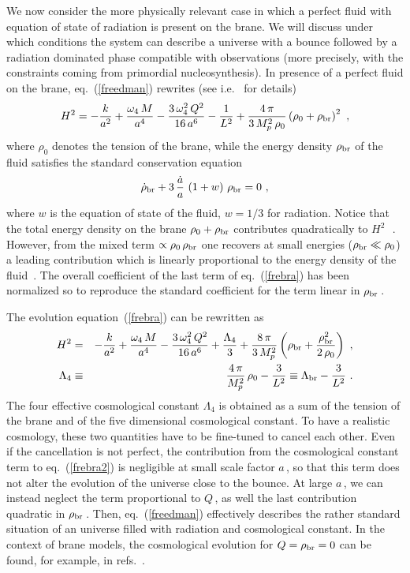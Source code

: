 \documentclass[a4paper,11pt]{article}
\begin{document}
We now consider the more physically relevant case in which a perfect fluid
with equation of state of radiation is present on the brane. We will
discuss under which conditions the system can describe a universe with a
bounce followed by a radiation dominated phase compatible with
observations (more precisely, with the constraints coming from primordial
nucleosynthesis). In presence of a perfect fluid on the brane,
eq.~(\ref{freedman}) rewrites (see i.e.~\cite{MV} for details)
%
\begin{equation}
H^2 = - \frac{k}{a^2} + \frac{\omega_4 \, M}{a^4} - \frac{3\,\omega_4^2\,Q^2}{16\,a^6} - \frac{1}{L^2} + \frac{4 \, \pi}{3 \, M_p^2 \, \rho_0} \left( \rho_0 + \rho_{\rm br} \right)^2 \,\,,
\label{frebra}
\end{equation}
%
where $\rho_0$ denotes the tension of the brane, while the energy density $\rho_{\rm br}$ of the fluid satisfies the standard conservation equation
%
\begin{equation}
\dot{\rho}_{\rm br} + 3 \, \frac{\dot{a}}{a} \, \left( 1 + w \right) \, \rho_{\rm br} = 0 \,\,,
\end{equation}
%
where $w$ is the equation of state of the fluid, $w=1/3$ for radiation. 
Notice that the total energy density on the brane $\rho_0+\rho_{\rm br}$
contributes quadratically to $H^2\,$~\cite{BDL}. However, from the mixed
term $\propto \rho_0 \, \rho_{\rm br}$ one recovers at small energies
($\rho_{\rm br} \ll \rho_0$) a leading contribution which is linearly
proportional to the energy density of the fluid~\cite{CGKT,CGS}. The
overall coefficient of the last term of eq.~(\ref{frebra}) has been
normalized so to reproduce the standard coefficient for the term linear in
$\rho_{\rm br}\,$.

The evolution equation~(\ref{frebra}) can be rewritten as
%
\begin{eqnarray}
H^2 &=& - \frac{k}{a^2} + \frac{\omega_4 \, M}{a^4} - \frac{3\,\omega_4^2\,Q^2}{16\,a^6} + \frac{\Lambda_4}{3} + \frac{8\,\pi}{3\,M_p^2} \left( \rho_{\rm br} + \frac{\rho_{\rm br}^2}{2\,\rho_0} \right) \,\,, \nonumber\\
\Lambda_4 &\equiv& \frac{4\,\pi}{M_p^2} \, \rho_0 - \frac{3}{L^2} \equiv
\Lambda_{\rm br} - \frac{3}{L^2} \,\,.
\label{frebra2}
\end{eqnarray}
%
The four effective cosmological constant $\Lambda_4$ is obtained as a sum
of the tension of the brane and of the five dimensional cosmological
constant. To have a realistic cosmology, these two quantities have to be
fine-tuned to cancel each other. Even if the cancellation is not perfect,
the contribution from the cosmological constant term to
eq.~(\ref{frebra2}) is negligible at small scale factor $a\,$, so that
this term does not alter the evolution of the universe close to the
bounce. At large $a\,$, we can instead neglect the term proportional to
$Q\,$, as well the last contribution quadratic in $\rho_{\rm br}\,$. Then,
eq.~(\ref{freedman}) effectively describes the rather standard situation
of an universe filled with radiation and cosmological constant. In the
context of brane models, the cosmological evolution for $Q=\rho_{\rm br} =
0$ can be found, for example, in refs.~\cite{PS,MD}.
\end{document}
